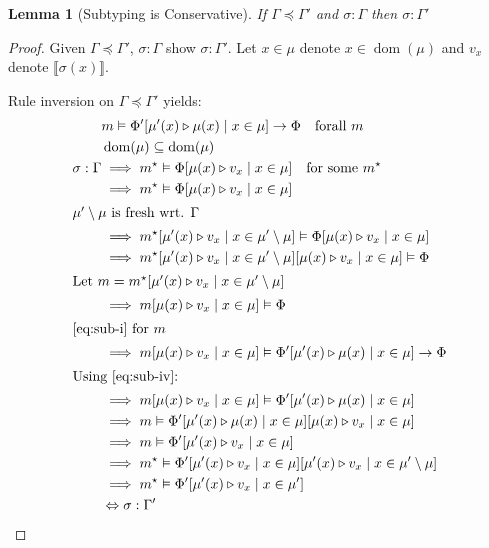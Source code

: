 \documentclass[twoside, english]{sdqthesis}
\newcommand{\bbracket}[1]{\llbracket #1 \rrbracket}
\newcommand{\tr}[0]{\triangleright}
\DeclareMathOperator{\dom}{dom}
\newtheorem{lemma}[theorem]{Lemma}
\theoremstyle{definition}
\begin{document}
\begin{lemma}[Subtyping is Conservative]\label{lem:conservative-subtype}
  If \hyperref[rule:Sub-Ctx]{$\Gamma \preceq \Gamma'$} and $\sigma : \Gamma$ then $\sigma : \Gamma'$
\end{lemma}

\begin{proof}
  Given $\Gamma \preceq \Gamma'$, $\sigma : \Gamma$ show $\sigma : \Gamma'$. Let $x \in \mu$ denote $x \in \dom(\mu)$ and $v_x$ denote $\bbracket{\sigma(x)}$.

  Rule inversion on $\Gamma \preceq \Gamma'$ yields:
  \begin{align}
      &m \vDash \Phi'[\mu'(x) \tr \mu(x) \mid x \in \mu] \to \Phi \quad \text{forall }m\label{eq:sub-i}
    \\ 
      & \dom(\mu) \subseteq \dom(\mu)\label{eq:sub-ii}
    \\ 
      \sigma : \Gamma 
      &\implies m^\star \vDash \Phi[\mu(x) \tr v_x \mid x \in \mu] \quad \text{for some }m^\star
    \\
      &\implies m^\star \vDash \Phi[\mu(x) \tr v_x \mid x \in \mu]
    \\ 
      \intertext{$\mu' \setminus \mu$  is fresh wrt. $\Gamma$}
      &\implies m^\star[\mu'(x) \tr v_x \mid x\in\mu'\setminus\mu] 
      \vDash \Phi[\mu(x) \tr v_x \mid x \in \mu] 
    \\
      &\implies  m^\star[\mu'(x) \tr v_x \mid x\in\mu'\setminus\mu][\mu(x) \tr v_x \mid x \in \mu] 
      \vDash \Phi
    \\
      \intertext{Let $m=m^\star[\mu'(x) \tr v_x \mid x \in \mu'\setminus\mu]$}
      &\implies  m[\mu(x) \tr v_x \mid x \in \mu] 
      \vDash \Phi\label{eq:sub-iv}
    \\
      \intertext{\cref{eq:sub-i} for $m$}
      &\implies m[\mu(x) \tr v_x \mid x \in \mu] 
      \vDash \Phi'[\mu'(x) \tr \mu(x) \mid x \in \mu] \to \Phi
    \\
      \intertext{Using \cref{eq:sub-iv}:}
      &\implies m[\mu(x) \tr v_x \mid x \in \mu] 
      \vDash \Phi'[\mu'(x) \tr \mu(x) \mid x \in \mu]
    \\
      &\implies m 
      \vDash \Phi'[\mu'(x) \tr \mu(x) \mid x \in \mu][\mu(x) \tr v_x \mid x \in \mu]
    \\
      &\implies m
      \vDash \Phi'[\mu'(x) \tr v_x \mid x \in \mu]
    \\
      &\implies m^\star
      \vDash \Phi'[\mu'(x) \tr v_x \mid x \in \mu][\mu'(x) \tr v_x \mid x \in \mu'\setminus\mu]
    \\
      &\implies m^\star
      \vDash \Phi'[\mu'(x) \tr v_x \mid x \in \mu']
    \\
      &\Leftrightarrow \sigma : \Gamma'
  \end{align}
\end{proof}
\end{document}

